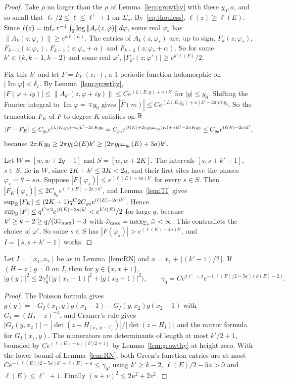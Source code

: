 \begin{proof}
Take $\rho$ no larger than the $\rho$ of Lemma~\ref{lem:growthy} with these $y_0,a$, and so small that $\ell_*/2\le\ell\le\ell^++1$ on $\Sigma_\rho$. By~\eqref{eq:thouless}, $\ell(z)\ge\ell(E)$. Since $\ell(z)=\inf_rr^{-1}\int_\mathbb T\log\|A_r(z,\varphi)\|\,d\varphi$, some real $\varphi_*$ has $\|A_k(z,\varphi_*)\|\ge e^{k\ell(E)}$. The entries of $A_k(z,\varphi_*)$ are, up to sign, $F_k(z;\varphi_*)$, $F_{k-1}(z;\varphi_*)$, $F_{k-1}(z;\varphi_*+\alpha)$ and $F_{k-2}(z;\varphi_*+\alpha)$. So for some $k'\in\{k,k-1,k-2\}$ and some real $\varphi'$, $|F_{k'}(z;\varphi')|\ge e^{k'\ell(E)}/2$.

Fix this $k'$ and let $F=F_{k'}(z;\cdot)$, a $1$-periodic function holomorphic on $|\operatorname{Im}\varphi|<\delta_v$. By Lemma~\ref{lem:growthy}, $|F(\varphi+iy)|\le\|A_{k'}(z,\varphi+iy)\|\le Ce^{(L(E,y)+a)k'}$ for $|y|\le y_0$. Shifting the Fourier integral to $\operatorname{Im}\varphi=\mp y_0$ gives $|\hat F(m)|\le Ce^{(L(E,y_0)+a)k'-2\pi|m|y_0}$. So the truncation $F_K$ of $F$ to degree $K$ satisfies on $\mathbb R$
\[
|F-F_K|\le C_{y_0}e^{(L(E,y_0)+a)k'-2\pi Ky_0}=C_{y_0}e^{(\ell(E)+2\pi y_0\omega_{y_0}(E)+a)k'-2\pi Ky_0}\le C_{y_0}e^{(\ell(E)-2a)k'},
\]
because $2\pi Ky_0\ge2\pi y_0\hat\omega(E)k'\ge(2\pi y_0\omega_{y_0}(E)+3a)k'$.

Let $W=[w,w+2q-1]$ and $S=[w,w+2K]$. The intervals $[s,s+k'-1]$, $s\in S$, lie in $W$, since $2K+k'\le3K<2q$, and their first sites have the phases $\varphi_s=\theta+s\alpha$. Suppose $|F(\varphi_s)|\le e^{(\ell(E)-4a)k'}$ for every $s\in S$. Then $|F_K(\varphi_s)|\le2C_{y_0}e^{(\ell(E)-2a)k'}$, and Lemma~\ref{lem:TI} gives $\sup_\mathbb R|F_K|\le(2K+1)q^C2C_{y_0}e^{(\ell(E)-2a)k'}$. Hence $\sup_\mathbb R|F|\le q^{C+2}e^{(\ell(E)-2a)k'}<e^{k'\ell(E)}/2$ for large $q$, because $k'\ge k-2\ge q/(3\hat\omega_{\max})-3$ with $\hat\omega_{\max}=\max_{\Sigma_\rho}\hat\omega<\infty$. This contradicts the choice of $\varphi'$. So some $s\in S$ has $|F(\varphi_s)|>e^{(\ell(E)-4a)k'}$, and $I=[s,s+k'-1]$ works.
\end{proof}

\begin{lemma}\label{lem:node}
Let $I=[x_1,x_2]$ be as in Lemma~\ref{lem:RN} and $x=x_1+\lfloor(k'-1)/2\rfloor$. If $(H-z)g=0$ on $I$, then for $y\in\{x,x+1\}$,
\[
|g(y)|^2\le2\gamma_0^2\bigl(|g(x_1-1)|^2+|g(x_2+1)|^2\bigr),\qquad\gamma_0=Ce^{2\ell^++2}e^{-(\ell(E)/2-5a)(k(E)-2)}.
\]
\end{lemma}

\begin{proof}
The Poisson formula gives $g(y)=-G_I(x_1,y)g(x_1-1)-G_I(y,x_2)g(x_2+1)$ with $G_I=(H_I-z)^{-1}$, and Cramer's rule gives $|G_I(y,x_2)|=|\det(z-H_{[x_1,y-1]})|/|\det(z-H_I)|$ and the mirror formula for $G_I(x_1,y)$. The numerators are determinants of length at most $k'/2+1$, bounded by $Ce^{(\ell(E)+a)(k'/2+1)}$ by Lemma~\ref{lem:growthy} at height zero. With the lower bound of Lemma~\ref{lem:RN}, both Green's function entries are at most $Ce^{-(\ell(E)/2-5a)k'+\ell(E)+a}\le\gamma_0$, using $k'\ge k-2$, $\ell(E)/2-5a>0$ and $\ell(E)\le\ell^++1$. Finally $(u+v)^2\le2u^2+2v^2$.
\end{proof}

